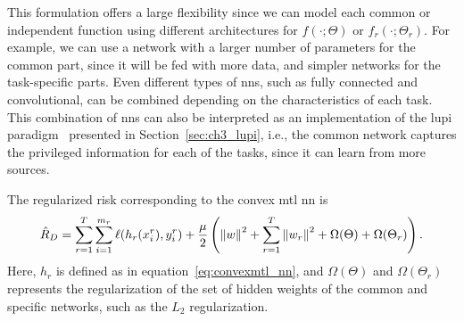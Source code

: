 This formulation offers a large flexibility since we can model each common or independent function using different architectures for $f(\cdot; \Theta)$ or $f_r(\cdot; \Theta_r)$.
%
For example, we can use a network with a larger number of parameters for the common part, since it will be fed with more data, and simpler networks for the task-specific parts.
%
Even different types of \acrshort{nns}, such as fully connected and convolutional, can be combined depending on the characteristics of each task.
This combination of \acrshort{nns} can also be interpreted as an implementation of the \acrfull{lupi} paradigm~\citep{VapnikI15a} presented in Section~\ref{sec:ch3_lupi}, i.e., the common network captures the privileged information for each of the tasks, since it can learn from more sources.
%

%
The regularized risk corresponding to the convex \acrshort{mtl} \acrshort{nn} is
\begin{equation}
    \nonumber
    \begin{aligned}
        \hat{R}_{D} = \sum_{r=1}^T \sum_{i=1}^{m_r} \ell(h_r(x_i^r), y_i^r) + \frac{\mu}{2} \left( \left\lVert w\right\rVert^2 + \sum_{r=1}^T \left\lVert w_r\right\rVert^2 + \Omega(\Theta) + \Omega(\Theta_r)\right) .
    \end{aligned}
\end{equation}
Here, $h_r$ is defined as in equation~\eqref{eq:convexmtl_nn}, and $\Omega(\Theta)$ and $\Omega(\Theta_r)$ represents the regularization of the set of hidden weights of the common and specific networks, such as the $L_2$ regularization.


